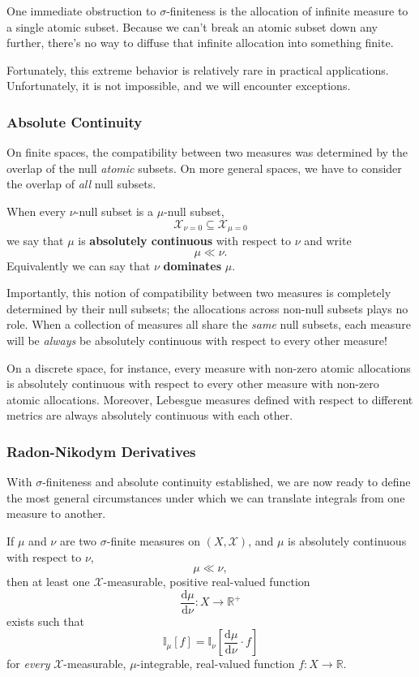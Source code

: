 \documentclass[
  letterpaper,
  DIV=11,
  numbers=noendperiod]{scrartcl}
\begin{document}
One immediate obstruction to \(\sigma\)-finiteness is the allocation of
infinite measure to a single atomic subset. Because we can't break an
atomic subset down any further, there's no way to diffuse that infinite
allocation into something finite.

Fortunately, this extreme behavior is relatively rare in practical
applications. Unfortunately, it is not impossible, and we will encounter
exceptions.

\subsubsection{Absolute Continuity}\label{absolute-continuity}

On finite spaces, the compatibility between two measures was determined
by the overlap of the null \emph{atomic} subsets. On more general
spaces, we have to consider the overlap of \emph{all} null subsets.

When every \(\nu\)-null subset is a \(\mu\)-null subset, \[
\mathcal{X}_{\nu = 0} \subseteq \mathcal{X}_{\mu = 0}
\] we say that \(\mu\) is \textbf{absolutely continuous} with respect to
\(\nu\) and write \[
\mu \ll \nu.
\] Equivalently we can say that \(\nu\) \textbf{dominates} \(\mu\).

Importantly, this notion of compatibility between two measures is
completely determined by their null subsets; the allocations across
non-null subsets plays no role. When a collection of measures all share
the \emph{same} null subsets, each measure will be \emph{always} be
absolutely continuous with respect to every other measure!

On a discrete space, for instance, every measure with non-zero atomic
allocations is absolutely continuous with respect to every other measure
with non-zero atomic allocations. Moreover, Lebesgue measures defined
with respect to different metrics are always absolutely continuous with
each other.

\subsubsection{Radon-Nikodym
Derivatives}\label{radon-nikodym-derivatives}

With \(\sigma\)-finiteness and absolute continuity established, we are
now ready to define the most general circumstances under which we can
translate integrals from one measure to another.

If \(\mu\) and \(\nu\) are two \(\sigma\)-finite measures on
\((X, \mathcal{X})\), and \(\mu\) is absolutely continuous with respect
to \(\nu\), \[
\mu \ll \nu,
\] then at least one \(\mathcal{X}\)-measurable, positive real-valued
function \[
\frac{ \mathrm{d} \mu }{ \mathrm{d} \nu } :
X \rightarrow \mathbb{R}^{+}
\] exists such that \[
\mathbb{I}_{\mu}[f] =
\mathbb{I}_{\nu} \left[
\frac{ \mathrm{d} \mu }{ \mathrm{d} \nu } \cdot f
\right]
\] for \emph{every} \(\mathcal{X}\)-measurable, \(\mu\)-integrable,
real-valued function \(f : X \rightarrow \mathbb{R}\).
\end{document}
